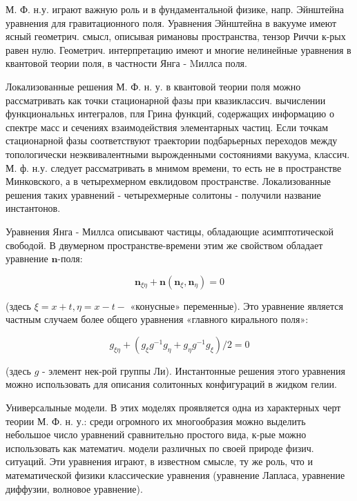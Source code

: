 \documentclass[10pt]{article}
\begin{document}
М. Ф. н.у. играют важную роль и в фундаментальной физике, напр. Эйнштейна уравнения для гравитационного поля. Уравнения Эйнштейна в вакууме имеют ясный геометрич. смысл, описывая римановы пространства, тензор Риччи к-рых равен нулю. Геометрич. интерпретацию имеют и многие нелинейные уравнения в квантовой теории поля, в частности Янга - Mиллса поля.



Локализованные решения М. Ф. н. у. в квантовой теории поля можно рассматривать как точки стационарной фазы при квазиклассич. вычислении функциональньх интегралов, пля Грина функций, содержащих информацию о спектре масс и сечениях взаимодействия элементарных частиц. Если точкам стационарной фазы соответствуют траектории подбарьерных переходов между топологически неэквивалентными вырожденными состояниями вакуума, классич. М. ф. н.у. следует рассматривать в мнимом времени, то есть не в пространстве Минковского, а в четырехмерном евклидовом пространстве. Локализованные решения таких уравнений - четырехмерные солитоны - получили название инстантонов.



Уравнения Янга - Миллса описывают частицы, обладающие асимптотической свободой. В двумерном пространстве-времени этим же свойством обладает уравнение $\boldsymbol{n}$-поля:



\[

\boldsymbol{n}_{\xi \eta}+\boldsymbol{n}\left(\boldsymbol{n}_{\xi}, \boldsymbol{n}_{\eta}\right)=0

\]



(здесь $\xi=x+t, \eta=x-t-$ «конусные» переменные). Это уравнение является частным случаем более общего уравнения «главного кирального поля»:



\[

g_{\xi \eta}+\left(g_{\xi} g^{-1} g_{\eta}+g_{\eta} g^{-1} g_{\xi}\right) / 2=0

\]



(здесь $g$ - элемент нек-рой группы Ли). Инстантонные решения этого уравнения можно использовать для описания солитонных конфигураций в жидком гелии.



Универсалыные модели. В этих моделях проявляется одна из характерных черт теории М. Ф. н. у.: среди огромного их многообразия можно выделить небольшое число уравнений сравнительно простого вида, к-рые можно использовать как математич. модели различных по своей природе физич. ситуаций. Эти уравнения играют, в известном смысле, ту же роль, что и математической физики классические уравнения (уравнение Лапласа, уравнение диффузии, волновое уравнение).
\end{document}
